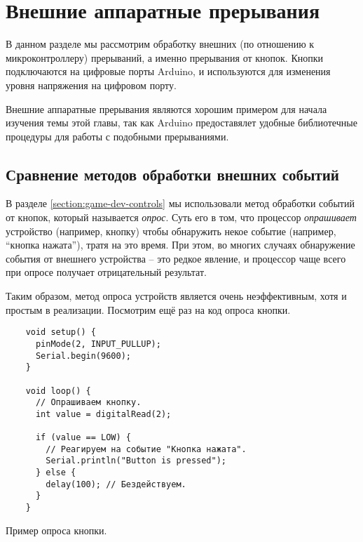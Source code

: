 \documentclass[../sparc.tex]{subfiles}
\begin{document}
\section{Внешние аппаратные прерывания}

В данном разделе мы рассмотрим обработку внешних (по отношению к
микроконтроллеру) прерываний, а именно прерывания от кнопок.  Кнопки
подключаются на цифровые порты Arduino, и используются для изменения уровня
напряжения на цифровом порту.

Внешние аппаратные прерывания являются хорошим примером для начала изучения темы
этой главы, так как Arduino предоставялет удобные библиотечные процедуры для
работы с подобными прерываниями.

\subsection{Сравнение методов обработки внешних событий}

В разделе \ref{section:game-dev-controls} мы использовали метод обработки
событий от кнопок, который называется \emph{опрос}.  Суть его в том, что
процессор \emph{опрашивает} устройство (например, кнопку) чтобы обнаружить некое
событие (например, ``кнопка нажата''), тратя на это время.  При этом, во многих
случаях обнаружение события от внешнего устройства -- это редкое явление, и
процессор чаще всего при опросе получает отрицательный результат.

Таким образом, метод опроса устройств является очень неэффективным, хотя и
простым в реализации.  Посмотрим ещё раз на код опроса кнопки.

\begin{listing}[H]
  \begin{verbatim}
    void setup() {
      pinMode(2, INPUT_PULLUP);
      Serial.begin(9600);
    }

    void loop() {
      // Опрашиваем кнопку.
      int value = digitalRead(2);

      if (value == LOW) {
        // Реагируем на событие "Кнопка нажата".
        Serial.println("Button is pressed");
      } else {
        delay(100); // Бездействуем.
      }
    }
  \end{verbatim}
  \caption{Пример опроса кнопки.}
  \label{listing:interrupts-polling-example}
\end{listing}
\end{document}
